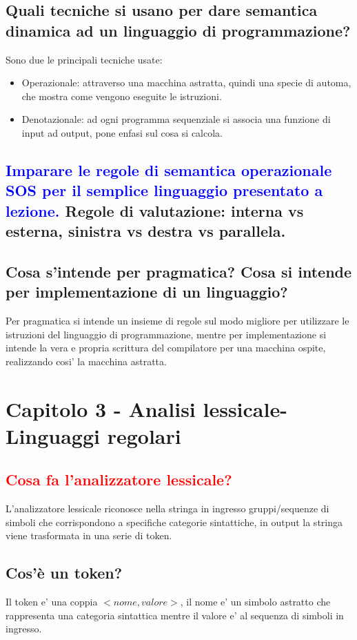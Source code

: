 \documentclass{article}
\begin{document}
\subsection{Quali tecniche si usano per dare semantica dinamica ad un linguaggio di programmazione?}
Sono due le principali tecniche usate:
\begin{itemize}
    \item Operazionale: attraverso una macchina astratta, quindi una specie di automa,
          che mostra come vengono eseguite le istruzioni.
    \item Denotazionale: ad ogni programma sequenziale si associa una funzione di input
          ad output, pone enfasi sul cosa si calcola.
\end{itemize}

\subsection{\textcolor{blue}{Imparare le regole di semantica operazionale SOS per il semplice linguaggio presentato a lezione.} Regole di valutazione: interna vs esterna, sinistra vs destra vs parallela.}
\subsection{Cosa s'intende per pragmatica? Cosa si intende per implementazione di un linguaggio?}
Per pragmatica si intende un insieme di regole sul modo migliore per utilizzare
le istruzioni del linguaggio di programmazione, mentre per implementazione si
intende la vera e propria scrittura del compilatore per una macchina ospite,
realizzando cosi' la macchina astratta.

\section{Capitolo 3 - Analisi lessicale-Linguaggi regolari}
\subsection{\textcolor{red}{Cosa fa l'analizzatore lessicale?}}
L'analizzatore lessicale riconosce nella stringa in ingresso gruppi/sequenze di simboli che corrispondono a specifiche categorie sintattiche, in output la stringa viene trasformata in una serie di token.
\subsection{Cos'è un token?}
Il token e' una coppia $<nome, valore>$, il nome e' un simbolo astratto che
rappresenta una categoria sintattica mentre il valore e' al sequenza di simboli
in ingresso.
\end{document}
